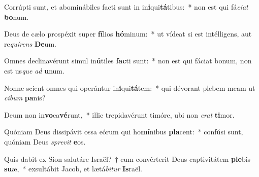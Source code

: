 \item Corrúpti sunt, et abominábiles facti sunt in in\textbf{i}qui\textbf{tá}tibus:~* non est qui fá\textit{ci}\textit{at} \textbf{bo}num.
\item Deus de cælo prospéxit super \textbf{fí}lios \textbf{hó}minum:~* ut vídeat si est intélligens, aut re\textit{quí}\textit{rens} \textbf{De}um.
\item Omnes declinavérunt simul in\textbf{ú}tiles \textbf{fac}ti sunt:~* non est qui fáciat bonum, non est us\textit{que} \textit{ad} \textbf{u}num.
\item Nonne scient omnes qui operántur in\textbf{i}qui\textbf{tá}tem:~* qui dévorant plebem meam ut \textit{ci}\textit{bum} \textbf{pa}nis?
\item Deum non in\textbf{vo}ca\textbf{vé}runt,~* illic trepidavérunt timóre, ubi non \textit{e}\textit{rat} \textbf{ti}mor.
\item Quóniam Deus dissipávit ossa eórum qui ho\textbf{mí}nibus \textbf{pla}cent:~* confúsi sunt, quóniam Deus \textit{spre}\textit{vit} \textbf{e}os.
\item Quis dabit ex Sion salutáre Israël?~† cum convérterit Deus captivitátem \textbf{ple}bis \textbf{su}æ,~* exsultábit Jacob, et lætá\textit{bi}\textit{tur} \textbf{Is}raël.
